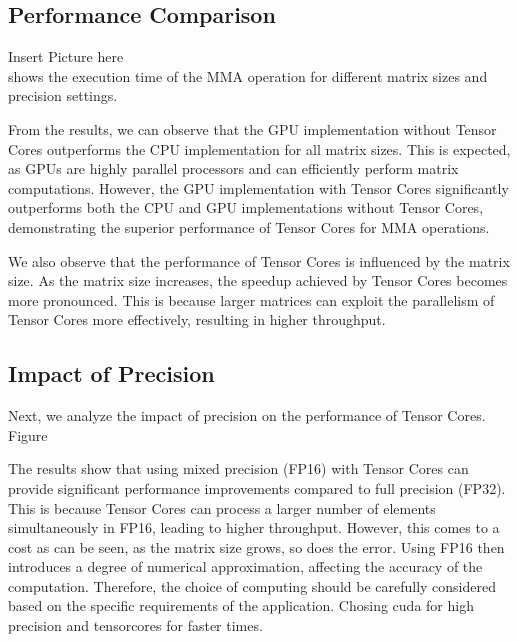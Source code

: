 \documentclass[conference]{IEEEtran}
\begin{document}
  \subsection{Performance Comparison}\label{sec:performance-comparison}

  Insert Picture here\\
  shows the execution time of the MMA operation for different matrix sizes and precision settings.
  
  \begin{figure}[htbp]
  \end{figure}
  
  From the results, we can observe that the GPU implementation without Tensor Cores outperforms the CPU implementation for all matrix sizes. This is expected, as GPUs are highly parallel processors and can efficiently perform matrix computations. However, the GPU implementation with Tensor Cores significantly outperforms both the CPU and GPU implementations without Tensor Cores, demonstrating the superior performance of Tensor Cores for MMA operations.
  
  We also observe that the performance of Tensor Cores is influenced by the matrix size. As the matrix size increases, the speedup achieved by Tensor Cores becomes more pronounced. This is because larger matrices can exploit the parallelism of Tensor Cores more effectively, resulting in higher throughput.
  
  \subsection{Impact of Precision}\label{sec:impact-precision}
  

  Next, we analyze the impact of precision on the performance of Tensor Cores. Figure %
  
  \begin{figure}[htbp]
  \end{figure}
  
  The results show that using mixed precision (FP16) with Tensor Cores can provide significant performance improvements compared to full precision (FP32).
  This is because Tensor Cores can process a larger number of elements simultaneously in FP16,
  leading to higher throughput. However, this comes to a cost as can be seen, as the matrix size grows, so does the error.
  Using FP16 then introduces a degree of numerical approximation, affecting the accuracy of the computation.
  Therefore, the choice of computing should be carefully considered based on the specific
  requirements of the application. Chosing cuda for high precision and tensorcores for faster times.
  
\end{document}
